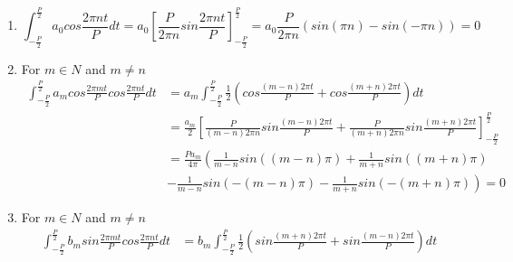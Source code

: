 \documentclass[titlepage]{article}
\begin{document}
    \begin{enumerate}
        \item \begin{equation*}
                \int_{-\frac{P}{2}}^{\frac{P}{2}}a_0cos\frac{2\pi nt}{P}dt
                = a_0  \left[\frac{P}{2\pi n}sin\frac{2\pi nt}{P}\right]_{-\frac{P}{2}}^{\frac{P}{2}}
                = a_0  \frac{P}{2\pi n}(sin(\pi n) - sin(-\pi n)) = 0
              \end{equation*}
        \item For $m \in N$ and $m \neq n$
            \begin{equation*}
            \begin{split}
                \int_{-\frac{P}{2}}^{\frac{P}{2}} a_mcos \frac{2\pi mt}{P} 
                cos\frac{2\pi nt}{P} dt %
                & = a_m  \int_{-\frac{P}{2}}^{\frac{P}{2}} \frac{1}{2} 
                \left( cos\frac{(m-n)2 \pi t}{P} 
                + cos\frac{(m+n)2 \pi t}{P} \right) dt \\%
                & = \frac{a_m}{2} \left[ \frac{P}{(m-n)2\pi n}
                sin\frac{(m-n)2 \pi t}{P} + \frac{P}{(m+n)2\pi n} 
                sin\frac{(m+n)2 \pi t}{P}  \right]_{-\frac{P}{2}}^{\frac{P}{2}} \\%
                & = \frac{Pa_m}{4\pi} \left( \frac{1}{m-n}sin((m-n)\pi)
                + \frac{1}{m+n} sin((m+n)\pi) \right. \\
                & \left. - \frac{1}{m-n} sin(-(m-n)\pi) - \frac{1}{m+n} 
                sin(-(m+n)\pi) \right) = 0
            \end{split}
            \end{equation*}
        \item For $m \in N$ and $m \neq n$
            \begin{equation*}
            \begin{split}
                \int_{-\frac{P}{2}}^{\frac{P}{2}} b_msin \frac{2\pi mt}{P} 
                cos\frac{2\pi nt}{P}dt %
                & = b_m  \int_{-\frac{P}{2}}^{\frac{P}{2}}\frac{1}{2} 
                \left(sin\frac{(m+n)2 \pi t}{P} + 
                sin\frac{(m-n)2 \pi t}{P}\right)dt \\ %

\end{split}
\end{equation*}
\end{enumerate}
\end{document}
